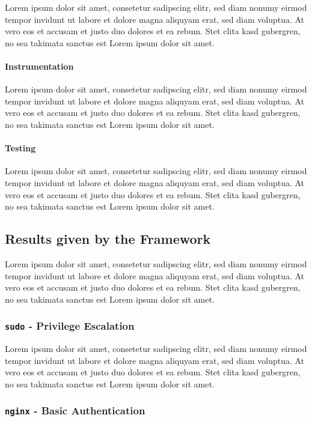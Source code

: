 Lorem ipsum dolor sit amet, consetetur sadipscing elitr, sed diam nonumy eirmod
tempor invidunt ut labore et dolore magna aliquyam erat, sed diam voluptua. At
vero eos et accusam et justo duo dolores et ea rebum. Stet clita kasd gubergren,
no sea takimata sanctus est Lorem ipsum dolor sit amet.

\paragraph{Instrumentation} Lorem ipsum dolor sit amet, consetetur sadipscing
elitr, sed diam nonumy eirmod tempor invidunt ut labore et dolore magna
aliquyam erat, sed diam voluptua. At vero eos et accusam et justo duo dolores
et ea rebum. Stet clita kasd gubergren, no sea takimata sanctus est Lorem ipsum
dolor sit amet.

\paragraph{Testing} Lorem ipsum dolor sit amet, consetetur sadipscing
elitr, sed diam nonumy eirmod tempor invidunt ut labore et dolore magna
aliquyam erat, sed diam voluptua. At vero eos et accusam et justo duo dolores
et ea rebum. Stet clita kasd gubergren, no sea takimata sanctus est Lorem ipsum
dolor sit amet.

\subsection{Results given by the Framework}

Lorem ipsum dolor sit amet, consetetur sadipscing elitr, sed diam nonumy eirmod
tempor invidunt ut labore et dolore magna aliquyam erat, sed diam voluptua. At
vero eos et accusam et justo duo dolores et ea rebum. Stet clita kasd gubergren,
no sea takimata sanctus est Lorem ipsum dolor sit amet.

\subsubsection{\texttt{sudo} - Privilege Escalation}

Lorem ipsum dolor sit amet, consetetur sadipscing elitr, sed diam nonumy eirmod
tempor invidunt ut labore et dolore magna aliquyam erat, sed diam voluptua. At
vero eos et accusam et justo duo dolores et ea rebum. Stet clita kasd gubergren,
no sea takimata sanctus est Lorem ipsum dolor sit amet.

\subsubsection{\texttt{nginx} - Basic Authentication}

